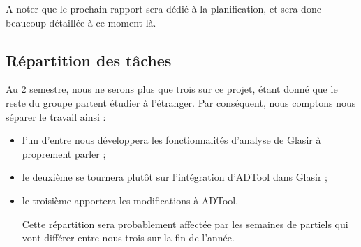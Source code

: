 		A noter que le prochain rapport sera dédié à la planification, et sera donc beaucoup détaillée à ce moment là.


	\subsection{Répartition des tâches}
	Au 2 semestre, nous ne serons plus que trois sur ce projet, étant donné que le reste du groupe partent étudier à l'étranger. Par conséquent, nous comptons nous séparer le travail ainsi :
	\begin{itemize}
	\item l'un d'entre nous développera les fonctionnalités d'analyse de Glasir à proprement parler ;
	\item le deuxième se tournera plutôt sur l'intégration d'ADTool dans Glasir ;
	\item le troisième apportera les modifications à ADTool.
	
	Cette répartition sera probablement affectée par les semaines de partiels qui vont différer entre nous trois sur la fin de l'année.
	\end{itemize}
